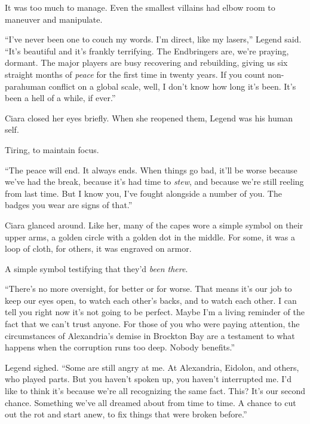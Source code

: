 It was too much to manage.  Even the smallest villains had elbow room to maneuver and manipulate.



``I've never been one to couch my words.  I'm direct, like my lasers,'' Legend said.  ``It's beautiful and it's frankly terrifying.  The Endbringers are, we're praying, dormant.  The major players are busy recovering and rebuilding, giving us six straight months of \emph{peace} for the first time in twenty years.  If you count non-parahuman conflict on a global scale, well, I don't know how long it's been.  It's been a hell of a while, if ever.''



Ciara closed her eyes briefly.  When she reopened them, Legend was his human self.



Tiring, to maintain focus.



``The peace will end.  It always ends.  When things go bad, it'll be worse because we've had the break, because it's had time to \emph{stew}, and because we're still reeling from last time.  But I know you, I've fought alongside a number of you.  The badges you wear are signs of that.''



Ciara glanced around.  Like her, many of the capes wore a simple symbol on their upper arms, a golden circle with a golden dot in the middle.  For some, it was a loop of cloth, for others, it was engraved on armor.



A simple symbol testifying that they'd \emph{been there}.



``There's no more oversight, for better or for worse.  That means it's our job to keep our eyes open, to watch each other's backs, and to watch each other.  I can tell you right now it's not going to be perfect.  Maybe I'm a living reminder of the fact that we can't trust anyone.  For those of you who were paying attention, the circumstances of Alexandria's demise in Brockton Bay are a testament to what happens when the corruption runs too deep.  Nobody benefits.''



Legend sighed.  ``Some are still angry at me.  At Alexandria, Eidolon, and others, who played parts.  But you haven't spoken up, you haven't interrupted me.  I'd like to think it's because we're all recognizing the same fact.  This?  It's our second chance.  Something we've all dreamed about from time to time.  A chance to cut out the rot and start anew, to fix things that were broken before.''



